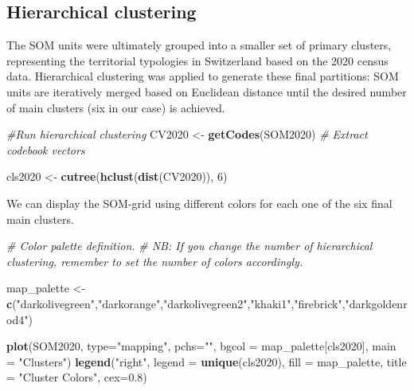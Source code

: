 \documentclass[
]{article}
\newenvironment{Shaded}{\begin{snugshade}}{\end{snugshade}}
\newcommand{\AttributeTok}[1]{\textcolor[rgb]{0.13,0.29,0.53}{#1}}
\newcommand{\CommentTok}[1]{\textcolor[rgb]{0.56,0.35,0.01}{\textit{#1}}}
\newcommand{\DecValTok}[1]{\textcolor[rgb]{0.00,0.00,0.81}{#1}}
\newcommand{\FloatTok}[1]{\textcolor[rgb]{0.00,0.00,0.81}{#1}}
\newcommand{\FunctionTok}[1]{\textcolor[rgb]{0.13,0.29,0.53}{\textbf{#1}}}
\newcommand{\NormalTok}[1]{#1}
\newcommand{\OtherTok}[1]{\textcolor[rgb]{0.56,0.35,0.01}{#1}}
\newcommand{\StringTok}[1]{\textcolor[rgb]{0.31,0.60,0.02}{#1}}
\begin{document}
\subsection{Hierarchical clustering}\label{hierarchical-clustering}

The SOM units were ultimately grouped into a smaller set of primary clusters, representing the territorial typologies in Switzerland based on the 2020 census data.
Hierarchical clustering was applied to generate these final partitions: SOM units are iteratively merged based on Euclidean distance until the desired number of main clusters (six in our case) is achieved.

\begin{Shaded}
\begin{Highlighting}[]
\CommentTok{\#Run hierarchical clustering}
\NormalTok{CV2020 }\OtherTok{\textless{}{-}} \FunctionTok{getCodes}\NormalTok{(SOM2020) }\CommentTok{\# Extract codebook vectors}

\NormalTok{cls2020 }\OtherTok{\textless{}{-}} \FunctionTok{cutree}\NormalTok{(}\FunctionTok{hclust}\NormalTok{(}\FunctionTok{dist}\NormalTok{(CV2020)), }\DecValTok{6}\NormalTok{)}
\end{Highlighting}
\end{Shaded}

We can display the SOM-grid using different colors for each one of the six final main clusters.

\begin{Shaded}
\begin{Highlighting}[]
\CommentTok{\# Color palette definition.}
\CommentTok{\# NB: If you change the number of hierarchical clustering, remember to set the number of colors accordingly.}

\NormalTok{map\_palette }\OtherTok{\textless{}{-}} \FunctionTok{c}\NormalTok{(}\StringTok{"darkolivegreen"}\NormalTok{,}\StringTok{"darkorange"}\NormalTok{,}\StringTok{"darkolivegreen2"}\NormalTok{,}\StringTok{"khaki1"}\NormalTok{,}\StringTok{"firebrick"}\NormalTok{,}\StringTok{"darkgoldenrod4"}\NormalTok{)}

\FunctionTok{plot}\NormalTok{(SOM2020, }\AttributeTok{type=}\StringTok{"mapping"}\NormalTok{, }\AttributeTok{pchs=}\StringTok{""}\NormalTok{, }\AttributeTok{bgcol =}\NormalTok{ map\_palette[cls2020], }\AttributeTok{main =} \StringTok{"Clusters"}\NormalTok{)}
\FunctionTok{legend}\NormalTok{(}\StringTok{"right"}\NormalTok{, }\AttributeTok{legend =} \FunctionTok{unique}\NormalTok{(cls2020), }\AttributeTok{fill =}\NormalTok{ map\_palette, }\AttributeTok{title =} \StringTok{"Cluster Colors"}\NormalTok{, }\AttributeTok{cex=}\FloatTok{0.8}\NormalTok{)}
\end{Highlighting}
\end{Shaded}
\end{document}
